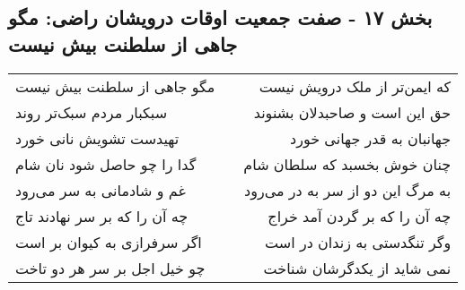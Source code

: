 \begin{center}
\section*{بخش ۱۷ - صفت جمعیت اوقات درویشان راضی: مگو جاهی از سلطنت بیش نیست}
\label{sec:017}
\begin{longtable}{l p{0.5cm} r}
مگو جاهی از سلطنت بیش نیست
&&
که ایمن‌تر از ملک درویش نیست
\\
سبکبار مردم سبک‌تر روند
&&
حق این است و صاحبدلان بشنوند
\\
تهیدست تشویش نانی خورد
&&
جهانبان به قدر جهانی خورد
\\
گدا را چو حاصل شود نان شام
&&
چنان خوش بخسبد که سلطان شام
\\
غم و شادمانی به سر می‌رود
&&
به مرگ این دو از سر به در می‌رود
\\
چه آن را که بر سر نهادند تاج
&&
چه آن را که بر گردن آمد خراج
\\
اگر سرفرازی به کیوان بر است
&&
وگر تنگدستی به زندان در است
\\
چو خیل اجل بر سر هر دو تاخت
&&
نمی شاید از یکدگرشان شناخت
\\
\end{longtable}
\end{center}
